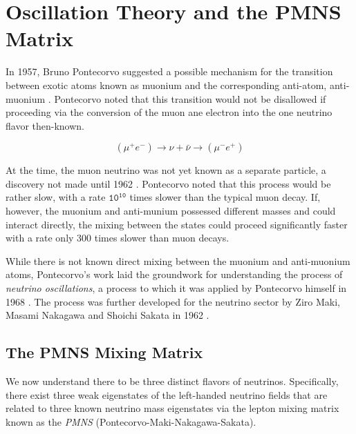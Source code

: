 \section{Oscillation Theory and the PMNS Matrix}

In 1957, Bruno Pontecorvo suggested a possible mechanism for the transition between exotic atoms known as muonium and the corresponding anti-atom, anti-muonium \cite{Pontecorvo-Mesonium}.
Pontecorvo noted that this transition would not be disallowed if proceeding via the conversion of the muon ane electron into the one neutrino flavor then-known.

\begin{equation}
   \left(\mu^+ e^-\right) \rightarrow \nu + \bar{\nu} \rightarrow \left(\mu^- e^+\right)
\end{equation}

At the time, the muon neutrino was not yet known as a separate particle, a discovery not made until 1962 \cite{Danby-NuMu}.
Pontecorvo noted that this process would be rather slow, with a rate $\mathtt{10^{10}}$ times slower than the typical muon decay. 
If, however, the muonium and anti-munium possessed different masses and could interact directly, the mixing between the states could proceed significantly faster with a rate only 300 times slower than muon decays.

While there is not known direct mixing between the muonium and anti-muonium atoms, Pontecorvo's work laid the groundwork for understanding the process of \emph{neutrino oscillations}, a process to which it was applied by Pontecorvo himself in 1968 \cite{Pontecorvo-Oscillations}.
The process was further developed for the neutrino sector by Ziro Maki, Masami Nakagawa and Shoichi Sakata in 1962 \cite{Maki-Nakagawa-Sakata}.

\subsection{The PMNS Mixing Matrix}

We now understand there to be three distinct flavors of neutrinos.
Specifically, there exist three weak eigenstates of the left-handed neutrino fields that are related to three known neutrino mass eigenstates via the lepton mixing matrix known as the \emph{PMNS} (Pontecorvo-Maki-Nakagawa-Sakata).

